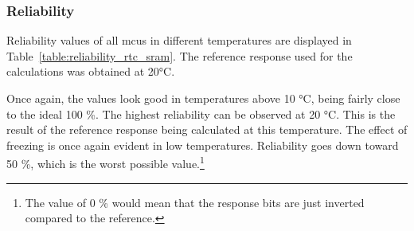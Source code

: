 \subsubsection*{Reliability}

Reliability values of all \glspl{mcu} in different temperatures are displayed in Table~\ref{table:reliability_rtc_sram}. The reference response used for the calculations was obtained at 20°C.

Once again, the values look good in temperatures above 10 °C, being fairly close to the ideal 100 \%. The highest reliability can be observed at 20 °C. This is the result of the reference response being calculated at this temperature. The effect of freezing is once again evident in low temperatures. Reliability goes down toward 50 \%, which is the worst possible value.\footnote{The value of 0 \% would mean that the response bits are just inverted compared to the reference.} 

